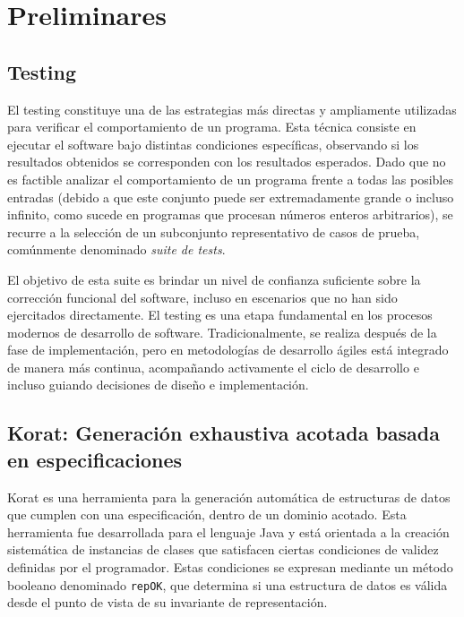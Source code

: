 \chapter[Preliminares]{Preliminares}
\label{cap:preliminares.BE}

\section{Testing}
El testing constituye una de las estrategias más directas y ampliamente utilizadas para verificar el comportamiento de un programa.
Esta técnica consiste en ejecutar el software bajo distintas condiciones específicas, observando si los resultados obtenidos se corresponden con los resultados esperados. 
Dado que no es factible analizar el comportamiento de un programa frente a todas las posibles entradas (debido a que este conjunto puede ser extremadamente grande o incluso infinito, como sucede en programas que procesan números enteros arbitrarios), 
se recurre a la selección de un subconjunto representativo de casos de prueba, comúnmente denominado \emph{suite de tests}.

El objetivo de esta suite es brindar un nivel de confianza suficiente sobre la corrección funcional del software, 
incluso en escenarios que no han sido ejercitados directamente. 
El testing es una etapa fundamental en los procesos modernos de desarrollo de software. 
Tradicionalmente, se realiza después de la fase de implementación, pero en metodologías de desarrollo ágiles está integrado de manera más continua, 
acompañando activamente el ciclo de desarrollo e incluso guiando decisiones de diseño e implementación.


%
\section{Korat: Generación exhaustiva acotada basada en especificaciones}
\label{sec:korat}


Korat es una herramienta para la generación automática de estructuras de datos que cumplen con una especificación, dentro de un dominio acotado. 
Esta herramienta fue desarrollada para el lenguaje Java y está orientada a la creación sistemática de instancias de clases que satisfacen ciertas condiciones de validez definidas por el programador. 
Estas condiciones se expresan mediante un método booleano denominado \texttt{repOK}, que determina si una estructura de datos es válida desde el punto de vista de su invariante de representación.

